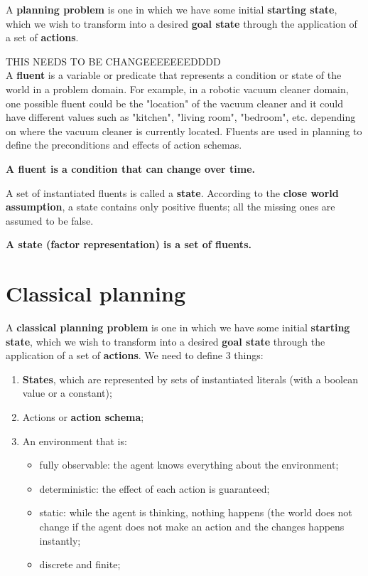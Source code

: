\documentclass{article}
\begin{document}
A \textbf{planning problem} is one in which we have some initial \textbf{starting state}, which we wish to transform into a desired \textbf{goal state} through the application of a set of \textbf{actions}. \\

\newpage

THIS NEEDS TO BE CHANGEEEEEEEDDDD \\

A \textbf{fluent} is a variable or predicate that represents a condition or state of the world in a problem domain. For example, in a robotic vacuum cleaner domain, one possible fluent could be the "location" of the vacuum cleaner and it could have different values such as "kitchen", "living room", "bedroom", etc. depending on where the vacuum cleaner is currently located. Fluents are used in planning to define the preconditions and effects of action schemas. \\

\begin{center}
    \textbf{A fluent is a condition that can change over time.}
\end{center}

A set of instantiated fluents is called a \textbf{state}. According to the \textbf{close world assumption}, a state contains only positive fluents; all the missing ones are assumed to be false. \\

\begin{center}
    \textbf{A state (factor representation) is a set of fluents.}
\end{center}

\newpage

\section{Classical planning}

A \textbf{classical planning problem} is one in which we have some initial \textbf{starting state}, which we wish to transform into a desired \textbf{goal state} through the application of a set of \textbf{actions}. We need to define 3 things:

\begin{enumerate}
    \item \textbf{States}, which are represented by sets of instantiated literals (with a boolean value or a constant);
    \item Actions or \textbf{action schema};
    \item An environment that is:
    \begin{itemize}
        \item fully observable: the agent knows everything about the environment;
        \item deterministic: the effect of each action is guaranteed;
        \item static: while the agent is thinking, nothing happens (the world does not change if the agent does not make an action and the changes happens instantly;
        \item discrete and finite;
    \end{itemize}
\end{enumerate}
\end{document}
